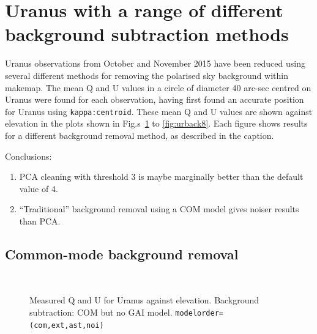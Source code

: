 \documentclass[twoside,11pt]{starlink}
\begin{document}
\section{Uranus with a range of different background subtraction methods}
\label{app:urback}
Uranus observations from October and November 2015 have been reduced
using several different methods for removing the polarised sky background
within makemap. The mean Q and U values in a circle of diameter 40
arc-sec centred on Uranus were found for each observation, having first
found an accurate position for Uranus using \texttt{kappa:centroid}.
These mean Q and U values are shown against elevation in the plots shown
in Fig.s~\ref{fig:urback1} to \ref{fig:urback8}. Each figure shows
results for a different background removal method, as described in the
caption.

Conclusions:
\begin{enumerate}
\item PCA cleaning with threshold 3 is maybe marginally better than the default
value of 4.
\item ``Traditional'' background removal using a COM model gives noiser results
than PCA.
\end{enumerate}

\subsection{Common-mode background removal}

\begin{figure}[H]
\centering
{}
\hspace*{10pt}
\\
\caption{Measured Q and U for Uranus against elevation. Background
subtraction: COM but no GAI model. \texttt{modelorder=(com,ext,ast,noi)}}
\label{fig:urback1}
\end{figure}
\end{document}
